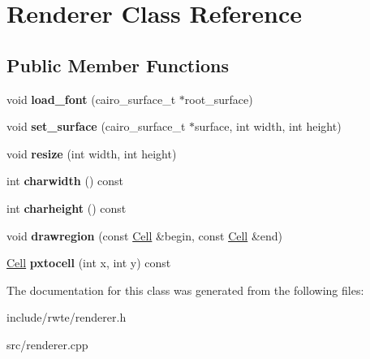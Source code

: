 \hypertarget{classRenderer}{}\section{Renderer Class Reference}
\label{classRenderer}
\subsection*{Public Member Functions}
\begin{DoxyCompactItemize}
\item 
\mbox{\label{classRenderer_a4b7c04548579835faa5657c40a6d0dc1}} 
void {\bfseries load\+\_\+font} (cairo\+\_\+surface\+\_\+t $\ast$root\+\_\+surface)
\item 
\mbox{\label{classRenderer_a7e0502b35edd57a005a145bf56760994}} 
void {\bfseries set\+\_\+surface} (cairo\+\_\+surface\+\_\+t $\ast$surface, int width, int height)
\item 
\mbox{\label{classRenderer_a9f4493c538688adaad4e4f0575fd3b8d}} 
void {\bfseries resize} (int width, int height)
\item 
\mbox{\label{classRenderer_aac02aa4f42a1e517e4232697ebd124f0}} 
int {\bfseries charwidth} () const
\item 
\mbox{\label{classRenderer_a7b64d3945605b7b0f240f11d4bacd3bd}} 
int {\bfseries charheight} () const
\item 
\mbox{\label{classRenderer_a317fc00b7e6e81664b97bf5fb7edfaa0}} 
void {\bfseries drawregion} (const \mbox{\hyperlink{structCell}{Cell}} \&begin, const \mbox{\hyperlink{structCell}{Cell}} \&end)
\item 
\mbox{\label{classRenderer_a09e98daeb88ba9e3d48314a58592017f}} 
\mbox{\hyperlink{structCell}{Cell}} {\bfseries pxtocell} (int x, int y) const
\end{DoxyCompactItemize}


The documentation for this class was generated from the following files\+:\begin{DoxyCompactItemize}
\item 
include/rwte/renderer.\+h\item 
src/renderer.\+cpp\end{DoxyCompactItemize}
